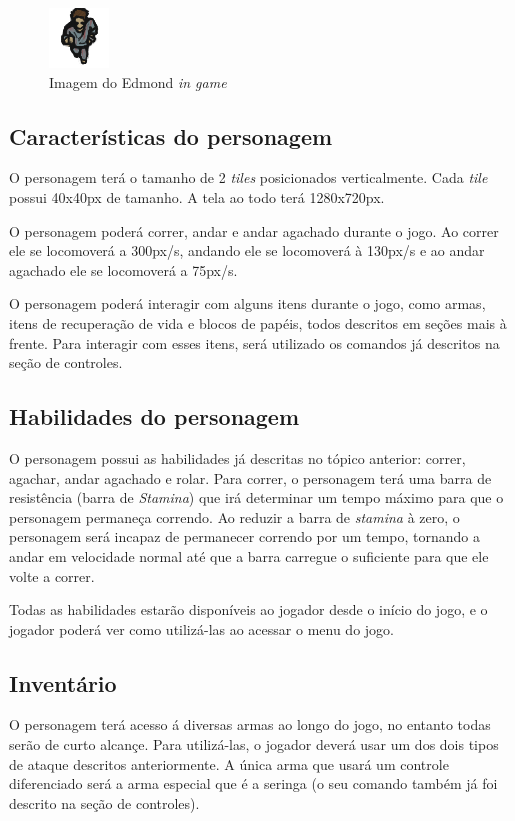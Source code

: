 \documentclass{article}
\begin{document}
\begin{figure}[h]
    \centering
    \caption{Imagem do Edmond \textit{in game}}
     \includegraphics[keepaspectratio=true,scale=4]{images/e_ig.png}
\end{figure}
\subsection{Características do personagem}
O personagem terá o tamanho de 2 \textit{tiles} posicionados verticalmente. Cada \textit{tile} possui 40x40px de tamanho. A tela ao todo terá 1280x720px. 

O personagem poderá correr, andar e andar agachado durante o jogo. Ao correr ele se locomoverá a 300px/s, andando ele se locomoverá à 130px/s e ao andar agachado ele se locomoverá a 75px/s.

O personagem poderá interagir com alguns itens durante o jogo, como armas, itens de recuperação de vida e blocos de papéis, todos descritos em seções mais à frente. Para interagir com esses itens, será utilizado os comandos já descritos na seção de controles.

\subsection{Habilidades do personagem}
O personagem possui as habilidades já descritas no tópico anterior: correr, agachar, andar agachado e rolar. Para correr, o personagem terá uma barra de resistência (barra de \textit{Stamina}) que irá determinar um tempo máximo para que o personagem permaneça correndo. Ao reduzir a barra de \textit{stamina} à zero, o personagem será incapaz de permanecer correndo por um tempo, tornando a andar em velocidade normal até que a barra carregue o suficiente para que ele volte a correr.

Todas as habilidades estarão disponíveis ao jogador desde o início do jogo, e o jogador poderá ver como utilizá-las ao acessar  o menu do jogo.

\subsection{Inventário}
O personagem terá acesso á diversas armas ao longo do jogo, no entanto todas serão de curto alcançe. Para utilizá-las, o jogador deverá usar um dos dois tipos de ataque descritos anteriormente. A única arma que usará um controle diferenciado será a arma especial que é a seringa (o seu comando também já foi descrito na seção de controles). 
\end{document}
